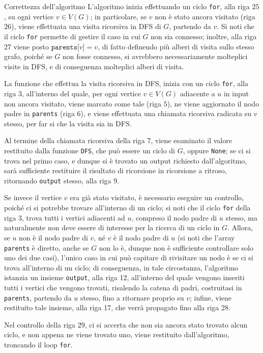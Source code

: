 \documentclass[a4paper, 12pt]{report}
\begin{document}
    \begin{framedobs}{Correttezza dell'algoritmo}
        L'algoritmo inizia effettuando un ciclo \texttt{for}, alla riga $25$, su ogni vertice $v \in V(G)$; in particolare, se $v$ non è stato ancora visitato (riga $26$), viene effettuata una visita ricorsiva in DFS di $G$, partendo da $v$. Si noti che il ciclo \texttt{for} permette di gestire il caso in cui $G$ non sia connesso; inoltre, alla riga 27 viene posto $\texttt{parents[}v\texttt{]} = v$, di fatto definendo più alberi di visita sullo stesso grafo, poiché se $G$ non fosse connesso, si avrebbero necessariamente molteplici visite in DFS, e di conseguenza molteplici alberi di visita.

        La funzione che effettua la visita ricorsiva in DFS, inizia con un ciclo \texttt{for}, alla riga $3$, all'interno del quale, per ogni vertice $v \in V(G)$ adiacente a $u$ in input non ancora visitato, viene marcato come tale (riga $5$), ne viene aggiornato il nodo padre in \texttt{parents} (riga $6$), e viene effettuata una chiamata ricorsiva radicata su $v$ stesso, per far si che la visita sia in DFS.

        Al termine della chiamata ricorsiva della riga 7, viene esaminato il valore restituito dalla funzione \texttt{DFS}, che può essere un ciclo di $G$, oppure \texttt{None}; se ci si trova nel primo caso, e dunque si è trovato un output richiesto dall'algoritmo, sarà sufficiente restituire il risultato di ricorsione in ricorsione a ritroso, ritornando \texttt{output} stesso, alla riga $9$.

        Se invece il vertice $v$ era già stato visitato, è necessario eseguire un controllo, poiché ci si potrebbe trovare all'interno di un ciclo; si noti che il ciclo \texttt{for} della riga 3, trova tutti i vertici adiacenti ad $u$, compreso il nodo padre di $u$ stesso, ma naturalmente non deve essere di interesse per la ricerca di un ciclo in $G$. Allora, se $u$ non è il nodo padre di $v$, né $v$ è il nodo padre di $u$ (si noti che l'array \texttt{parents} è diretto, anche se $G$ non lo è, dunque non è sufficiente controllare solo uno dei due casi), l'unico caso in cui può capitare di rivisitare un nodo è se ci si trova all'interno di un ciclo; di conseguenza, in tale circostanza, l'algoritmo istanzia un insieme \texttt{output}, alla riga 12, all'interno del quale vengono inseriti tutti i vertici che vengono trovati, risalendo la catena di padri, costruitasi in \texttt{parents}, partendo da $u$ stesso, fino a ritornare proprio su $v$; infine, viene restituito tale insieme, alla riga 17, che verrà propagato fino alla riga 28.

        Nel controllo della riga 29, ci si accerta che non sia ancora stato trovato alcun ciclo, e non appena ne viene trovato uno, viene restituito dall'algoritmo, troncando il loop \texttt{for}.
    \end{framedobs}
\end{document}
